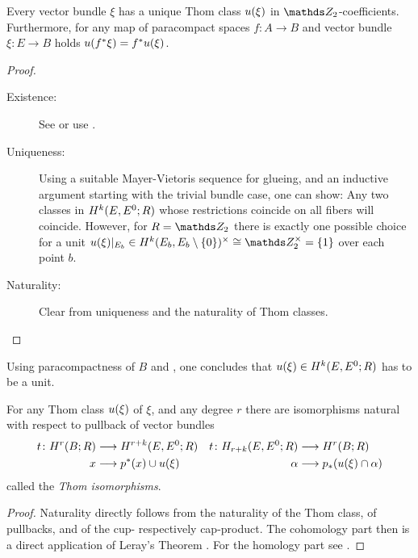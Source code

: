 \begin{Thm}
  Every vector bundle $\xi$ has a unique Thom class $u(\xi)$ in
  $\Zmod2$-coefficients.
  Furthermore, for any map of paracompact spaces $f\colon A\to B$ and
  vector bundle $\xi\colon E\to B$ holds $u({f}^* \xi) = {f}^* u(\xi)$.
  \begin{proof}
    \begin{description}
    \item[Existence:] See \cite[Theorem~4D.10]{hatcher} or use
      \cite[Proposition~17.9.3]{tomdieck}.
    \item[Uniqueness:] %
      Using a suitable Mayer-Vietoris sequence for glueing, and an
      inductive argument starting with the trivial bundle case, one can show:
      Any two classes in $H^{k}(E, {E}^0;R)$ whose
      restrictions coincide on all fibers will coincide.
      However, for $R=\Zmod2$ there is exactly one possible choice for
      a unit $\u(\xi)|_{E_b}\in
      H^{\rkk}(\spherepair{E_b})^\times\cong\Zmod2^\times=\{1\}$
      over each point $b$.
    \item[Naturality:] Clear from uniqueness and the naturality of Thom classes.
    \end{description}
  \end{proof}
\end{Thm}

\begin{Rem}
  Using paracompactness of $B$ and
  \cite[Proposition~17.9.6]{tomdieck}, one concludes that
  $u(\xi)\in H^{k}(E, {E}^0;R)$ has to be a unit.
\end{Rem}

\begin{Thm}
  For any Thom class $u(\xi)$ of $\xi$, and any degree $r$ there are
  isomorphisms natural with respect to pullback of vector bundles
  \begin{align*}
    t\colon
    H^r(B;R) &\longrightarrow H^{r+k}(E, {E}^0; R)
    & t\colon
      H_{r+k}(E, {E}^0; R) &\longrightarrow H^r(B;R)
    \\
    x &\longrightarrow {p}^* (x) \cup u(\xi)
    & \alpha &\longrightarrow {p}_* (u(\xi) \cap \alpha)
  \end{align*}
  called the \emph{Thom isomorphisms}.
  \begin{proof} %
    Naturality directly follows from the naturality of the Thom class,
    of pullbacks, and of the cup- respectively cap-product.
    The cohomology part then is a direct application of Leray's Theorem
    \cite[Theorem~4D.8]{hatcher}.
    For the homology part see \forexample \cite[Theorem~14.6]{switzer}.
  \end{proof}
\end{Thm}

